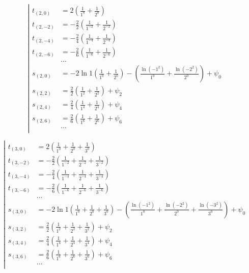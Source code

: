 \begin{equation*} \left| \begin{aligned}
t_{(2,0)} &=
  2
  \left(
  \frac{1}{1^0}
+ \frac{1}{2^0}
  \right) \\
%
t_{(2,-2)} &=
- \frac{2}{2}
  \left(
  \frac{1}{1^{-2}}
+ \frac{1}{2^{-2}}
  \right) \\
%
t_{(2,-4)} &=
- \frac{2}{4}
  \left(
  \frac{1}{1^{-4}}
+ \frac{1}{2^{-4}}
  \right) \\
%
t_{(2,-6)} &=
- \frac{2}{6}
  \left(
  \frac{1}{1^{-6}}
+ \frac{1}{2^{-6}}
  \right) \\
%
&\ldots \\
%
s_{(2,0)} &=
- 2 \ln{1}
  \left(
  \frac{1}{1^0}
+ \frac{1}{2^0}
  \right)
- \left(
  \frac{\ln{(- 1^2)}}{1^0}
+ \frac{\ln{(- 2^2)}}{2^0}
  \right)
+ \psi_0 \\
%
s_{(2,2)} &=
  \frac{2}{2}
  \left(
  \frac{1}{1^2}
+ \frac{1}{2^2}
  \right)
+ \psi_2 \\
%
s_{(2,4)} &=
  \frac{2}{4}
  \left(
  \frac{1}{1^4}
+ \frac{1}{2^4}
  \right)
+ \psi_4 \\
%
s_{(2,6)} &=
  \frac{2}{6}
  \left(
  \frac{1}{1^6}
+ \frac{1}{2^6}
  \right)
+ \psi_6 \\
%
&\ldots \\
\end{aligned} \right. \end{equation*}

\begin{equation*} \left| \begin{aligned}
t_{(3,0)} &=
  2
  \left(
  \frac{1}{1^0}
+ \frac{1}{2^0}
+ \frac{1}{3^0}
  \right) \\
%
t_{(3,-2)} &=
- \frac{2}{2}
  \left(
  \frac{1}{1^{-2}}
+ \frac{1}{2^{-2}}
+ \frac{1}{3^{-2}}
  \right) \\
%
t_{(3,-4)} &=
- \frac{2}{4}
  \left(
  \frac{1}{1^{-4}}
+ \frac{1}{2^{-4}}
+ \frac{1}{3^{-4}}
  \right) \\
%
t_{(3,-6)} &=
- \frac{2}{6}
  \left(
  \frac{1}{1^{-6}}
+ \frac{1}{2^{-6}}
+ \frac{1}{3^{-6}}
  \right) \\
%
&\ldots \\
%
s_{(3,0)} &=
- 2 \ln{1}
  \left(
  \frac{1}{1^0}
+ \frac{1}{2^0}
+ \frac{1}{3^0}
  \right)
- \left(
  \frac{\ln{(- 1^2)}}{1^0}
+ \frac{\ln{(- 2^2)}}{2^0}
+ \frac{\ln{(- 3^2)}}{3^0}
  \right)
+ \psi_0 \\
%
s_{(3,2)} &=
  \frac{2}{2}
  \left(
  \frac{1}{1^2}
+ \frac{1}{2^2}
+ \frac{1}{3^2}
  \right)
+ \psi_2 \\
%
s_{(3,4)} &=
  \frac{2}{4}
  \left(
  \frac{1}{1^4}
+ \frac{1}{2^4}
+ \frac{1}{3^4}
  \right)
+ \psi_4 \\
%
s_{(3,6)} &=
  \frac{2}{6}
  \left(
  \frac{1}{1^6}
+ \frac{1}{2^6}
+ \frac{1}{3^6}
  \right)
+ \psi_6 \\
%
&\ldots \\
\end{aligned} \right. \end{equation*}

